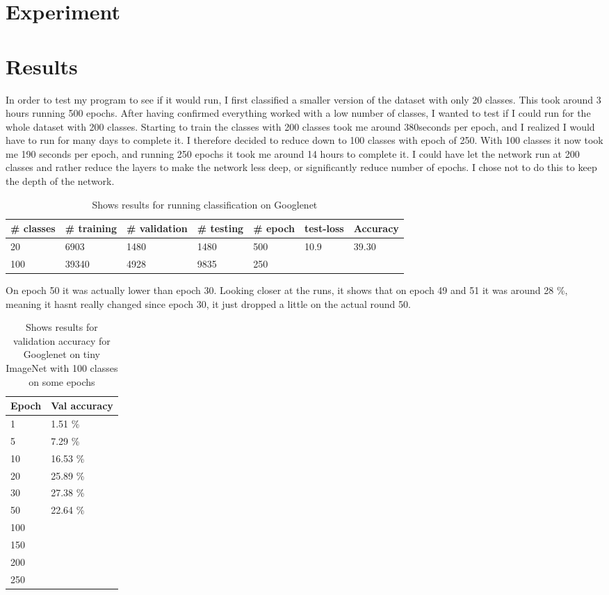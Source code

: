 \documentclass[twoside,11pt]{article}
\begin{document}
\section{Experiment}


\section{Results}
In order to test my program to see if it would run, I first classified a smaller version of the dataset with only 20 classes. This took around 3 hours running 500 epochs. After having confirmed everything worked with a low number of classes, I wanted to test if I could run for the whole dataset with 200 classes. Starting to train the classes with 200 classes took me around 380seconds per epoch, and I realized I would have to run for many days to complete it. I therefore decided to reduce down to 100 classes with epoch of 250. With 100 classes it now took me 190 seconds per epoch, and running 250 epochs it took me around 14 hours to complete it. I could have let the network run at 200 classes and rather reduce the layers to make the network less deep, or significantly reduce number of epochs. I chose not to do this to keep the depth of the network.

\begin{table}[!htbp]
  \centering
\caption{\label{tab:results} Shows results for running classification on Googlenet}
\begin{tabular}{| l l l l l l l|}
  \hline
  \# classes & \# training & \# validation & \# testing & \# epoch & test-loss & Accuracy\\ \hline
  20 & 6903 & 1480 & 1480 & 500 & 10.9 & 39.30 \\
  100 & 39340 & 4928 & 9835 & 250 & & \\
  \hline  
\end{tabular}
\end{table}

On epoch 50 it was actually lower than epoch 30. Looking closer at the runs, it shows that on epoch 49 and 51 it was around 28 \%, meaning it hasnt really changed since epoch 30, it just dropped a little on the actual round 50. 

\begin{table}[!htbp]
  \centering
\caption{\label{tab:results} Shows results for validation accuracy for Googlenet on tiny ImageNet with 100 classes on some epochs}
\begin{tabular}{| l l |}
  \hline
  Epoch & Val accuracy \\ \hline
  1 & 1.51 \%\\
  5 & 7.29 \%\\
  10 & 16.53 \%\\
  20 & 25.89 \%\\
  30 & 27.38 \%\\
  50 & 22.64 \%\\
  100 & \\
  150 & \\
  200 & \\
  250 & \\
  \hline  
\end{tabular}
\end{table}
\end{document}
